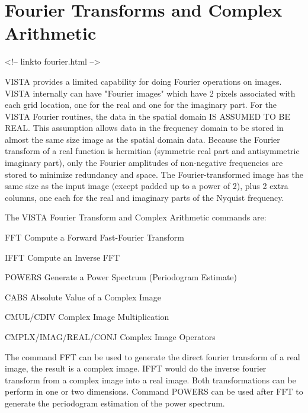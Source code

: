 \chapter{Fourier Transforms and Complex Arithmetic}
\begin{rawhtml}
<!-- linkto fourier.html -->
\end{rawhtml}

%
%

VISTA provides a limited capability for doing Fourier operations on images.
VISTA internally can have "Fourier images" which have 2 pixels associated
with each grid location, one for the real and one for the imaginary
part. For the VISTA Fourier routines, the data in the spatial domain IS
ASSUMED TO BE REAL. This assumption allows data in the frequency domain to
be stored in almost the same size image as the spatial domain data. Because
the Fourier transform of a real function is hermitian (symmetric real part
and antisymmetric imaginary part), only the Fourier amplitudes of
non-negative frequencies are stored to minimize redundancy and space.  The
Fourier-transformed image has the same size as the input image (except
padded up to a power of 2), plus 2 extra columns, one each for the real and
imaginary parts of the Nyquist frequency.

The VISTA Fourier Transform and Complex Arithmetic commands are:
\begin{example}
  \item[FFT]{Compute a Forward Fast-Fourier Transform}
  \item[IFFT]{Compute an Inverse FFT}
  \item[POWERS]{Generate a Power Spectrum (Periodogram Estimate)}
  \item[CABS]{Absolute Value of a Complex Image}
  \item[CMUL/CDIV]{Complex Image Multiplication}
  \item[CMPLX/IMAG/REAL/CONJ]{Complex Image Operators}
\end{example}

The command FFT can be used to generate the direct fourier transform of a
real image, the result is a complex image. IFFT would do the inverse
fourier transform from a complex image into a real image. Both
transformations can be perform in one or two dimensions. Command POWERS can
be used after FFT to generate the periodogram estimation of the power
spectrum.  

